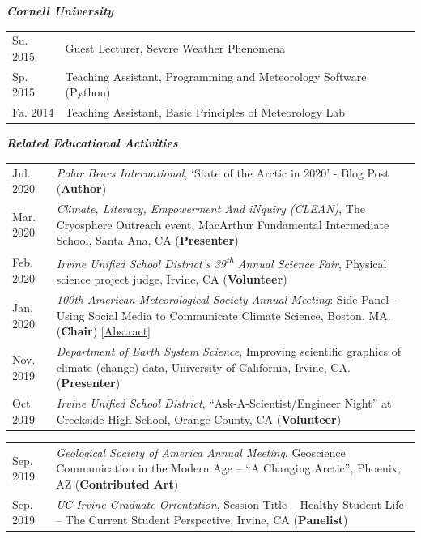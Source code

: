 \documentclass[margin,line,palatino,courier,10pt]{res}
\begin{document}
\begin{resume}
\textit{\textbf{Cornell University}}
\vspace*{0.05in}\\
\begin{tabular}{@{}p{0.9in}p{4in}}
Su. 2015 & Guest Lecturer, Severe Weather Phenomena\\
Sp. 2015 & Teaching Assistant, Programming and Meteorology Software (Python)\\
Fa. 2014 & Teaching Assistant, Basic Principles of Meteorology Lab\\
\end{tabular}

\textit{\textbf{Related Educational Activities}}
\vspace*{0.05in}\\
\begin{tabular}{@{}p{0.9in}p{4in}}
Jul. 2020 & \textit{Polar Bears International}, `State of the Arctic in 2020' - Blog Post (\textbf{Author})\\
Mar. 2020 &\textit{Climate, Literacy, Empowerment And iNquiry (CLEAN)}, The Cryosphere Outreach event, MacArthur Fundamental Intermediate School, Santa Ana, CA (\textbf{Presenter})\\
Feb. 2020 & \textit{Irvine Unified School District's 39\textsuperscript{th} Annual Science Fair}, Physical science project judge, Irvine, CA (\textbf{Volunteer})\\
Jan. 2020 & \textit{100th American Meteorological Society Annual Meeting}: Side Panel - Using Social Media to Communicate Climate Science, Boston, MA. (\textbf{Chair}) \href{https://ams.confex.com/ams/2020Annual/meetingapp.cgi/Session/53195}{[Abstract]}\\
Nov. 2019 & \textit{Department of Earth System Science}, Improving scientific graphics of climate (change) data, University of California, Irvine, CA. (\textbf{Presenter})\\
Oct. 2019 & \textit{Irvine Unified School District}, ``Ask-A-Scientist/Engineer Night'' at Creekside High School, Orange County, CA (\textbf{Volunteer})\\
\end{tabular}
\begin{tabular}{@{}p{0.9in}p{4in}}
Sep. 2019 & \textit{Geological Society of America Annual Meeting}, Geoscience Communication in the Modern Age -- ``A Changing Arctic'', Phoenix, AZ (\textbf{Contributed Art})\\
Sep. 2019 & \textit{UC Irvine Graduate Orientation}, Session Title -- Healthy Student Life -- The Current Student Perspective, Irvine, CA (\textbf{Panelist})\\

\end{tabular}
\end{resume}
\end{document}
